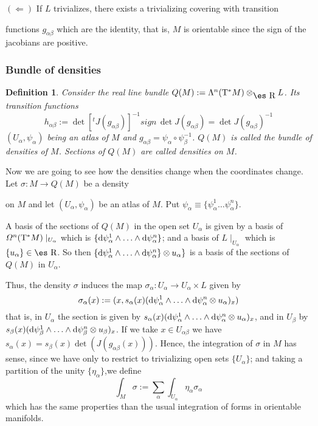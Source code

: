 \documentclass[12pt]{article}
\newtheorem{definition}{Definition}
\def\qed{\ifvmode\removelastskip\fi
{\unskip\nobreak\hfil\penalty50\hbox{}\nobreak\hfil
\hbox{\vrule height1.2ex width1.2ex}\parfillskip=0pt
\finalhyphendemerits=0 \par\smallskip}}
\def\d{{\rm d}}
\def\Real{\mbox{\es R}}
\def\Tan{{\rm T}}
\begin{document}
$(\Longleftarrow)$ \quad
If $L$ trivializes, there exists a trivializing covering with transition

functions
$g_{\alpha \beta}$ which are the identity, that is, $M$ is orientable
since the sign of the jacobians are positive.
\qed


\subsubsection{Bundle of densities}


\begin{definition}
Consider the real line bundle $Q(M) := \Lambda^n(\Tan^* M)
\otimes_{\Real} L$.
Its transition functions
$$
h_{\alpha \beta} :=
\det [^tJ(g_{\alpha \beta})]^{-1} sign\, \det J(g_{\alpha \beta})=
\det J(g_{\alpha \beta})^{-1}
$$
$(U_{\alpha},\psi_{\alpha})$ being an atlas of $M$ and
$g_{\alpha \beta} = \psi_{\alpha} \circ \psi_{\beta}^{-1}$.
$Q(M)$ is called the {\rm bundle of densities} of $M$.
Sections of $Q(M)$ are called {\rm densities} on $M$.
\label{dens}
\end{definition}

Now we are going to see how the densities change
when the coordinates change. Let $\sigma \colon M \to Q(M)$ be a density

on $M$
and let $(U_{\alpha},\psi_{\alpha})$ be an atlas of $M$.
Put $\psi_{\alpha} \equiv \{ \psi_{\alpha}^1 \ldots \psi_{\alpha}^n \}$.

A basis of the sections of $Q(M)$ in the open set $U_{\alpha}$ is given
by
a basis of ${\mit\Omega}^n(\Tan^* M) \mid_{U_{\alpha}}$
which is $\{ \d \psi_{\alpha}^1 \wedge \ldots \wedge \d \psi_{\alpha}^n
\}$;
and a basis of $L \mid_{U_{\alpha}}$ which is $\{ u_{\alpha} \} \in
\Real$.
So then $\{ \d \psi_{\alpha}^1 \wedge \ldots \wedge \d \psi_{\alpha}^n
\}\otimes u_{\alpha} \}$
is a basis of the sections of $Q(M)$ in $U_{\alpha}$.

Thus, the density $\sigma$ induces the map
$\sigma_{\alpha}\colon U_{\alpha} \to U_{\alpha} \times L$
given by
$$
\sigma_{\alpha}(x) :=(x,s_{\alpha}(x)
(\d \psi_{\alpha}^1 \wedge \ldots \wedge \d \psi_{\alpha}^n
\otimes u_{\alpha})_x)
$$
that is, in $U_{\alpha}$ the section is given by
$s_{\alpha}(x) (\d
\psi_{\alpha}^1\wedge\ldots\wedge\d\psi_{\alpha}^n\otimes
u_{\alpha})_x$,
and in $U_{\beta}$ by
 $s_{\beta}(x)(\d \psi_{\beta}^1\wedge
 \ldots\wedge\d\psi_{\beta}^n\otimes u_{\beta})_x$.
If we take $x \in U_{\alpha \beta}$ we have
$s_{\alpha}(x) =s_{\beta}(x) \det (J(g_{\alpha \beta}(x)))$.
Hence, the integration of $\sigma$ in $M$ has sense,
since we have only to restrict to trivializing open sets $\{ U_{\alpha}
\}$;
and taking a partition of the unity $\{ \eta_{\alpha} \}$,we define
$$
\int_M \sigma :=
\sum_{\alpha}\int_{U_{\alpha}} \eta_{\alpha}  \sigma_{\alpha}
$$
which has the same properties than the
usual integration of forms in orientable manifolds.
\end{document}
